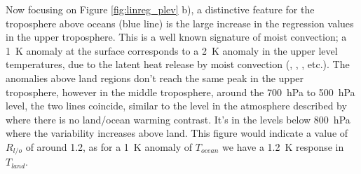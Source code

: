Now focusing on Figure \ref{fig:linreg_plev} b), a distinctive feature for the 
troposphere above oceans (blue line) is the large increase in the regression 
values in the upper troposphere. This is a well known signature of moist
convection; a \SI{1}{\kelvin} anomaly at the surface corresponds to a 
\SI{2}{\kelvin} anomaly in the upper level temperatures, due to the latent heat 
release by moist convection (\citet{Joshi2007}, \citet{Byrne2013}, 
\citet{Dommenget2009}, etc.). The anomalies above land regions don't reach the 
same peak in the upper troposphere, however in the middle troposphere, around 
the \SI{700}{\hecto\pascal} to \SI{500}{\hecto\pascal} level, the two lines 
coincide, similar to the level in the atmosphere described by \citet{Joshi2007} 
where there is no land/ocean warming contrast. It's in the levels below 
\SI{800}{\hecto\pascal} where the variability increases above land. This figure 
would indicate a value of $R_{l/o}$ of around 1.2, as for a \SI{1}{\kelvin} 
anomaly of $T_{ocean}$ we have a \SI{1.2}{\kelvin} response in $T_{land}$.  


